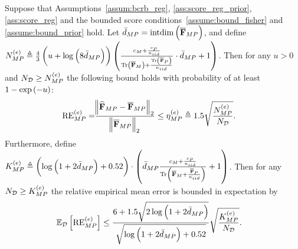 \begin{theorem}\label{thm:sampling_mp}
    Suppose that  Assumptions~\ref{assum:bcrb_reg}, \ref{ass:score_reg_prior}, \ref{ass:score_reg} and the bounded score conditions~\ref{assume:bound_fisher} and \ref{assume:bound_prior} hold.
    Let %
    { ${\bar{d}_{MP}}=\mathrm{intdim}\left(\overline{\mathbf{F}}_{MP}\right)$, and define $N_{MP}^{(e)}\triangleq \frac{4}{3}\left(u+\log\left(8 {\bar{d}_{MP}}\right)\right)\left(\frac{ c_M+\frac{c_P}{n_{iid}}}{\mathrm{Tr}\left(\overline{\mathbf{F}}_{M}\right)+\frac{\mathrm{Tr}\left(\overline{\mathbf{F}}_{P}\right)}{n_{iid}}}\cdot {\bar{d}_{MP}}+1\right)$. }
     Then for any $u>0$ and $N_{\mathcal{D}}\geq N_{MP}^{(e)}$ the following bound holds with probability {of at least } $1-\exp{\left(-u\right)}$:
    \begin{align}\label{eq:re_error_mp_mean}
        {\mathrm{RE}_{MP}^{(e)}}=&\frac{\norm{\widehat{\mathbf{F}}_{MP}-\overline{\mathbf{F}}_{MP}}_2}{\norm{\overline{\mathbf{F}}_{MP}}_2}\leq \eta_{MP}^{(e)}\triangleq {1.5}\sqrt{\frac{N_{MP}^{(e)}}{N_{\mathcal{D}}}}. 
    \end{align}
    Furthermore, define ${K}_{MP}^{(e)}\triangleq\left(\log\left(1+2{\bar{d}_{MP}}\right) +{0.52}\right)\cdot\left({\bar{d}_{MP}}\frac{ c_M+\frac{c_P}{n_{iid}}}{\mathrm{Tr}\left(\overline{\mathbf{F}}_{M}+\frac{\overline{\mathbf{F}}_{P}}{n_{iid}}\right)}+1\right)$. Then %
    {for any $N_{\mathcal{D}}\geq {K}_{MP}^{(e)}$ the relative empirical mean error is bounded in expectation by}
     \begin{align}\label{eq:emprical_mean_error_mp_expection}
        &\mathbb{E}_{\mathcal{D}}\left[\mathrm{RE}_{MP}^{(e)}\right]\leq \frac{6+1.5\sqrt{2\log\left(1+2{\bar{d}_{MP}}\right)}}{\sqrt{\log\left(1+2{\bar{d}_{MP}}\right) +{0.52}}}\sqrt{\frac{{K}_{MP}^{(e)}}{N_{\mathcal{D}}}}.
    \end{align}
\end{theorem}
